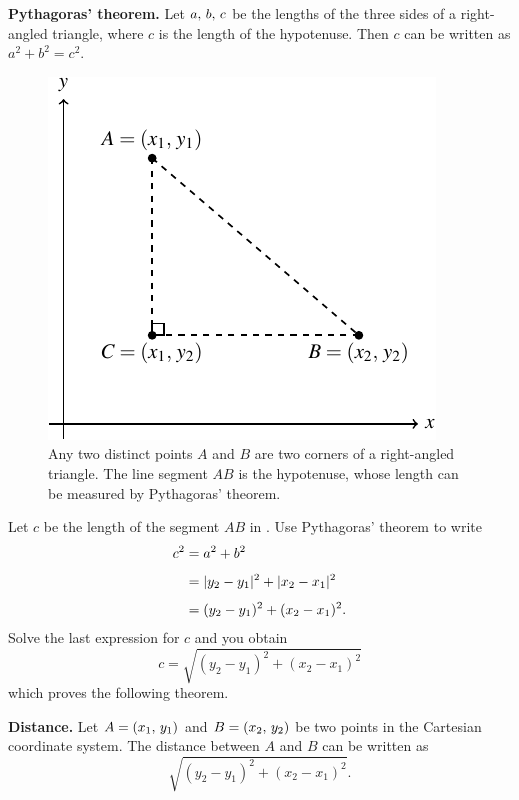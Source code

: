 \documentclass[a4paper,oneside,12pt]{article}
\begin{document}
\begin{theorem}
\textbf{Pythagoras' theorem.}
Let ${a},\, {b},\, {c}$ be the lengths of the three sides of a
right-angled triangle, where $c$ is the length of the hypotenuse.
Then $c$ can be written as $a^2 + b^2 = c^2$.
\end{theorem}

\begin{figure}[!htbp]
\centering
\includegraphics[scale=1.1]{image/03/distance-two-points.pdf}
\caption{%
  Any two distinct points $A$ and $B$ are two corners of a
  right-angled triangle.  The line segment $AB$ is the hypotenuse,
  whose length can be measured by Pythagoras' theorem.
}
\label{fig:distance_between_two_points}
\end{figure}

Let $c$ be the length of the segment $AB$ in
.  Use Pythagoras' theorem to
write
\begin{align*}
c^2
&=
a^2 + b^2 \\[4pt]
&=
\lvert y_2 - y_1\rvert^2 + \lvert x_2 - x_1\rvert^2 \\[4pt]
&=
(y_2 - y_1)^2 + (x_2 - x_1)^2.
\end{align*}
Solve the last expression for $c$ and you obtain
\[
c
=
\sqrt{
  (y_2 - y_1)^2
  +
  (x_2 - x_1)^2
}
\]
which proves the following theorem.

\begin{theorem}
\label{thm:distance_between_two_points}
\textbf{Distance.}
Let $A = \left\lparen{x_1},\, {y_1}\right\rparen$ and $B = \left\lparen{x_2},\, {y_2}\right\rparen$ be two points in
the Cartesian coordinate system.  The distance between $A$ and $B$ can
be written as
\[
\sqrt{
  (y_2 - y_1)^2
  +
  (x_2 - x_1)^2
}.
\]
\end{theorem}
\end{document}

